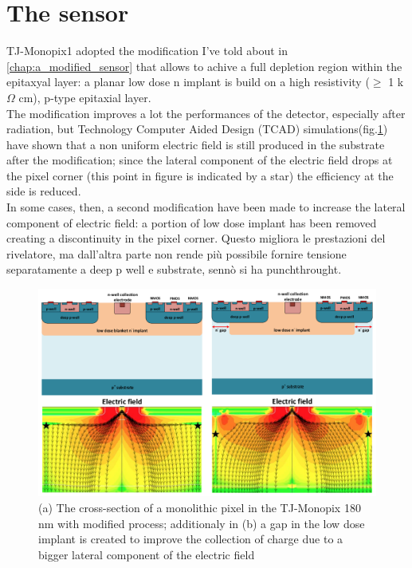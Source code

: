 \section{The sensor}
    TJ-Monopix1 adopted the modification I've told about in \ref{chap:a_modified_sensor} that allows to achive a full depletion region within the epitaxyal layer: a planar low dose n implant is build on a high resistivity ($\geq $ 1 k$\Omega$ cm), p-type epitaxial layer.\\
    The modification improves a lot the performances of the detector, especially after radiation, but  Technology Computer Aided Design (TCAD) simulations(fig.\ref{fig:Monopix1_section_scheme}) have shown that a non uniform electric field is still produced in the substrate after the modification; since the lateral component of the electric field drops at the pixel corner (this point in figure is indicated by a star) the efficiency at the side is reduced. \\
    In some cases, then, a second modification have been made to increase the lateral component of electric field: a portion of low dose implant has been removed creating a discontinuity in the pixel corner. Questo migliora le prestazioni del rivelatore, ma dall'altra parte non rende più possibile fornire tensione separatamente a deep p well e substrate, sennò si ha punchthrought.
    \begin{figure}[h!]
        \centering
        \includegraphics[width=.9\linewidth]{figures/Monopix1/Monopix1_section_scheme.png}
        \caption{(a) The cross-section of a monolithic pixel in the TJ-Monopix 180 nm with modified process; additionaly in (b) a gap in the low dose implant is created to improve the collection of charge due to a bigger lateral component of the electric field}
        \label{fig:Monopix1_section_scheme}
    \end{figure}
